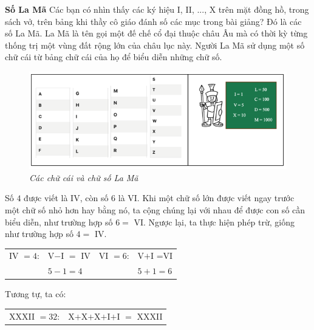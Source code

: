 \begin{multicols}{2}
\begin{center}
	\end{center}
	\vskip 0.1cm
	\textbf{\color{toancuabi}Số La Mã}
	\vskip 0.1cm
	Các bạn có nhìn thấy các ký hiệu I, II, ..., X trên mặt đồng hồ, trong sách vở, trên bảng khi thầy cô giáo đánh số các mục trong bài giảng? Đó là các số La Mã. La Mã là tên gọi một đế chế cổ đại thuộc châu Âu mà có thời kỳ từng thống trị một vùng đất rộng lớn của châu lục này. Người La Mã sử dụng một số chữ cái từ bảng chữ cái của họ để biểu diễn những chữ số.
	\begin{figure}[H]
		\centering
		\vspace*{-10pt}
		\captionsetup{labelformat= empty, justification=centering}
		\includegraphics[width=1\linewidth]{111}
		\caption{\small\textit{\color{toancuabi}Các chữ cái và chữ số La Mã}}
		\vspace*{-10pt}
	\end{figure}
	Số $4$ được viết là IV, còn số $6$ là VI. Khi một chữ số lớn được viết ngay trước  một chữ số nhỏ hơn hay bằng nó, ta cộng chúng lại với nhau để được con số cần biểu diễn, như trường hợp số $6=$ VI. Ngược lại, ta thực hiện phép trừ, giống như trường hợp số $4=$ IV.
	\begin{table}[H]
		\centering
		\setlength{\tabcolsep}{4.5pt}
		\renewcommand{\arraystretch}{1.25}
		\begin{tabular}{|l l|l l|}
			\hline
			IV $=4$:&    V$-$I $=$ IV & VI $=6$:&    V$+$I =VI\\
			&$5-1=4$ & &$5+1=6$\\
			\hline
		\end{tabular}
		\vspace*{-10pt}
	\end{table}
	Tương tự, ta có:
	\begin{table}[H]
		\vspace*{-10pt}
		\centering
		\setlength{\tabcolsep}{3.7pt}
		\renewcommand{\arraystretch}{1.25}
		\begin{tabular}{|l l|}
				\hline
				XXXII $\!=\! 32$:&    X$+$X$+$X$+$I$+$I $\!=\!$ XXXII\\

\end{tabular}
\end{table}
\end{multicols}
